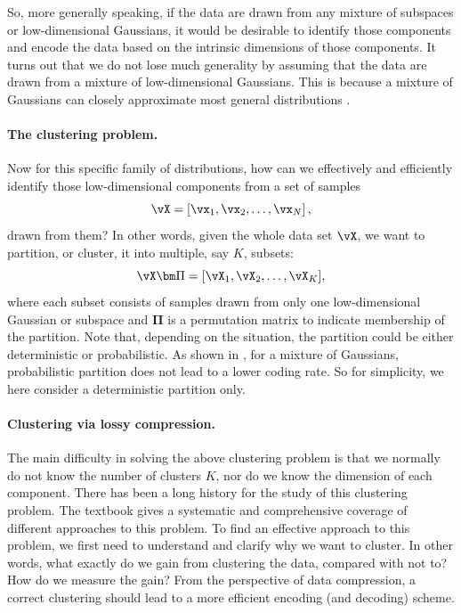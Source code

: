 \documentclass[../../book-main.tex]{subfiles}
\begin{document}
So, more generally speaking, if the data are drawn from any mixture
of subspaces or low-dimensional Gaussians, it would be desirable to
identify those components and encode the data based on the intrinsic
dimensions of those components. It turns out that we do not lose much
generality by assuming that the data are drawn from a mixture of
low-dimensional Gaussians. This is because a mixture of Gaussians can
closely approximate most general distributions \cite{borkar2016gaussian}.

\paragraph{The clustering problem.}
Now for this specific family of distributions, how can we effectively
and efficiently identify those low-dimensional components from a set of samples
\begin{equation}
    \vX = \left[\vx_1, \vx_2, \ldots, \vx_N\right],
\end{equation}
drawn from them? In other words, given the whole data set $\vX$, we
want to partition, or cluster, it into multiple, say $K$, subsets:
\begin{equation}
    \vX\bm \Pi = [\vX_1, \vX_2, \dots, \vX_K],
\end{equation}
where each subset consists of samples drawn from only one
low-dimensional Gaussian or subspace and $\bm \Pi$ is a permutation
matrix to indicate membership of the partition. Note that, depending on
the situation, the partition could be either deterministic or
probabilistic. As shown in \cite{ma2007segmentation}, for a mixture of
Gaussians, probabilistic partition does not lead to a lower coding
rate. So for simplicity, we here consider a deterministic partition only.

\paragraph{Clustering via lossy compression.}
The main difficulty in solving the above clustering problem is that
we normally do not know the number of clusters $K$, nor do we know
the dimension of each component. There has been a long history for
the study of this clustering problem. The textbook \cite{GPCA} gives
a systematic and comprehensive coverage of different approaches to
this problem. To find an effective approach to this problem, we first
need to understand and clarify why we want to cluster. In other
words, what exactly do we gain from clustering the data, compared
with not to? How do we measure the gain? From the perspective of data
compression, a correct clustering should lead to a more efficient
encoding (and decoding) scheme.
\end{document}
